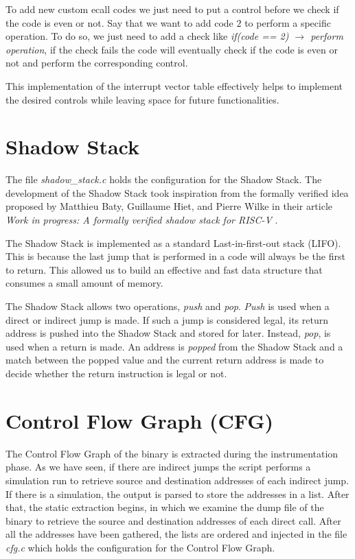 To add new custom ecall codes we just need to put a control before we check if
the code is even or not. Say that we want to add code $2$ to perform a specific operation.
To do so, we just need to add a check like \textit{if(code == 2) $\rightarrow$
perform operation}, if the check fails the code will eventually check if the code
is even or not and perform the corresponding control.

This implementation of the interrupt vector table effectively helps to implement
the desired controls while leaving space for future functionalities.

\section{Shadow Stack}
\label{sec:project_ss}

The file \textit{shadow\_stack.c} holds the configuration for the Shadow Stack.
The development of the Shadow Stack took inspiration from the formally verified
idea proposed by Matthieu Baty, Guillaume Hiet, and Pierre Wilke in their
article \textit{Work in progress: A formally verified shadow stack for RISC-V} \cite{shadowstack}.

The Shadow Stack is implemented as a standard Last-in-first-out stack (LIFO).
This is because the last jump that is performed in a code will always be the
first to return. This allowed us to build an effective and fast data structure that
consumes a small amount of memory.

The Shadow Stack allows two operations, \textit{push} and \textit{pop}. \textit{Push}
is used when a direct or indirect jump is made. If such a jump is considered legal,
its return address is pushed into the Shadow Stack and stored for later. Instead,
\textit{pop}, is used when a return is made. An address is \textit{popped} from
the Shadow Stack and a match between the popped value and the current return
address is made to decide whether the return instruction is legal or not.

\section{Control Flow Graph (CFG)}
\label{sec:project_cfg}

The Control Flow Graph of the binary is extracted during the instrumentation phase.
As we have seen, if there are indirect jumps the script performs a simulation run
to retrieve source and destination addresses of each indirect jump. If there is
a simulation, the output is parsed to store the addresses in a list. After that,
the static extraction begins, in which we examine the dump file of the binary to
retrieve the source and destination addresses of each direct call. After all the
addresses have been gathered, the lists are ordered and injected in the file
\textit{cfg.c} which holds the configuration for the Control Flow Graph.

